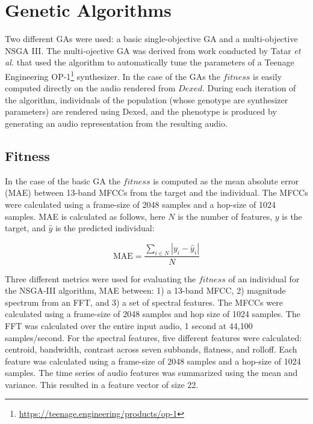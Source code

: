 \section{Genetic Algorithms}
Two different GAs were used: a basic single-objective GA and a multi-objective NSGA III. The multi-ojective GA was derived from work conducted by Tatar \textit{et al.} \cite{tatar2016automatic} that used the algorithm to automatically tune the parameters of a Teenage Engineering OP-1\footnote{\url{https://teenage.engineering/products/op-1}} synthesizer. In the case of the GAs the $fitness$ is easily computed directly on the audio rendered from $Dexed$. During each iteration of the algorithm, individuals of the population (whose genotype are synthesizer parameters) are rendered using Dexed, and the phenotype is produced by generating an audio representation from the resulting audio.

\subsection{Fitness}
In the case of the basic GA the $fitness$ is computed as the mean absolute error (MAE) between 13-band MFCCs from the target and the individual. The MFCCs were calculated using a frame-size of 2048 samples and a hop-size of 1024 samples. MAE is calculated as follows, here $N$ is the number of features, $y$ is the target, and $\hat{y}$ is the predicted individual:

\begin{equation}\label{equation:mae}
    \text{MAE} = \frac{\sum_{i \in N}{|y_i - \hat{y}_i|}}{N}
\end{equation}
 
 Three different metrics were used for evaluating the $fitness$ of an individual for the NSGA-III algorithm, MAE between: 1) a 13-band MFCC, 2) magnitude spectrum from an FFT, and 3) a set of spectral features. The MFCCs were calculated using a frame-size of 2048 samples and hop size of 1024 samples. The FFT was calculated over the entire input audio, 1 second at 44,100 samples/second. For the spectral features, five different features were calculated: centroid, bandwidth, contrast across seven subbands, flatness, and rolloff. Each feature was calculated using a frame-size of 2048 samples and a hop-size of 1024 samples. The time series of audio features was summarized using the mean and variance. This resulted in a feature vector of size 22.
 
